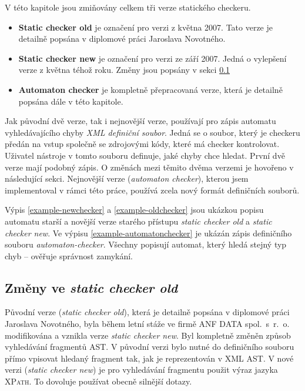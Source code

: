 \documentclass[11pt,final,oneside]{fithesis}
\begin{document}
V této kapitole jsou zmiňovány celkem tři verze statického checkeru.
\begin{itemize}
	\item \textbf{Static checker old} je označení pro verzi z května 2007. Tato verze je detailně popsána v diplomové práci Jaroslava Novotného\cite{jarek}.
	\item \textbf{Static checker new} je označení pro verzi ze září 2007. Jedná o vylepšení verze z května téhož roku. Změny jsou popsány v sekci \ref{old-new}
	\item \textbf{Automaton checker} je kompletně přepracovaná verze, která je detailně popsána dále v této kapitole.
\end{itemize}

Jak původní dvě verze, tak i nejnovější verze, používají pro zápis automatu vyhledávajícího chyby \textit{XML definiční soubor}. Jedná se o soubor, který je checkeru předán na vstup společně se zdrojovými kódy, které má checker kontrolovat. Uživatel nástroje v tomto souboru definuje, jaké chyby chce hledat. První dvě verze mají podobný zápis. O změnách mezi těmito dvěma verzemi je hovořeno v následující sekci. Nejnovější verze (\textit{automaton checker}), kterou jsem implementoval v rámci této práce, používá zcela nový formát definičních souborů.

Výpis \ref{example-newchecker} a \ref{example-oldchecker} jsou ukázkou popisu automatu starší a novější verze starého přístupu \textit{static checker old} a \textit{static checker new}. Ve výpisu \ref{example-automatonchecker} je ukázán zápis definičního souboru \textit{automaton-checker}. Všechny popisují automat, který hledá stejný typ chyb -- ověřuje správnost zamykání.

\subsection{Změny ve \textit{static checker old}}\label{old-new}

Původní verze (\textit{static checker old}), která je detailně popsána v diplomové práci Jaroslava Novotného\cite{jarek}, byla během letní stáže ve firmě ANF DATA spol.~s~r.~o. modifikována a vznikla verze \textit{static checker new}. Byl kompletně změněn způsob vyhledávání fragmentů AST. V původní verzi bylo nutné do definičního souboru přímo vpisovat hledaný fragment tak, jak je reprezentován v XML AST. V nové verzi (\textit{static checker new}) je pro vyhledávání fragmentu použit výraz jazyka \textsc{XPath}\cite{xpath}. To dovoluje používat obecně silnější dotazy.
\end{document}
